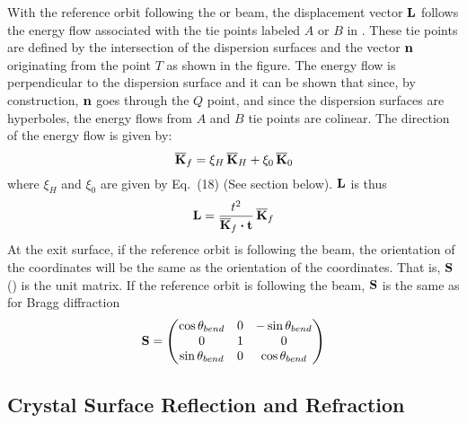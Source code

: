 With the reference orbit following the  or  beam, the
displacement vector ${\bf L}$ follows the energy flow associated with the tie points labeled $A$ or $B$
in . These tie points are defined by the intersection of the dispersion
surfaces and the vector ${\bf n}$ originating from the point $T$ as shown in the figure.  The energy
flow is perpendicular to the dispersion surface and it can be shown that since, by construction,
${\bf n}$ goes through the $Q$ point, and since the dispersion surfaces are hyperboles, the energy
flows from $A$ and $B$ tie points are colinear. The direction of the energy flow is given by:
\begin{equation}
  \overline{{\bf K}}_f = \xi_H \, \overline{{\bf K}}_H + \xi_0 \, \overline{{\bf K}}_0
\end{equation}
where $\xi_H$ and $\xi_0$ are given by \cite{b:batterman} Eq.~(18) (See section  below).
${\bf L}$ is thus
\begin{equation}
  {\bf L} = \frac{t^2}{\overline{{\bf K}}_f \mathbin{\boldsymbol{\cdot}} {\bf t}} \, \overline{{\bf K}}_f
\end{equation}
At the exit surface, if the reference orbit is following the  beam, the
orientation of the  coordinates will be the same as the orientation of the
 coordinates. That is, ${\bf S}$ () is the unit matrix.  If the reference
orbit is following the  beam, ${\bf S}$ is the same as for Bragg diffraction
\begin{equation}
  {\bf S} = 
  \begin{pmatrix}
    \cos\theta_{bend} & 0 & -\sin\theta_{bend} \\
    0                 & 1 & 0           \\
    \sin\theta_{bend} & 0 & \cos\theta_{bend}
  \end{pmatrix}
\end{equation}

\subsection{Crystal Surface Reflection and Refraction}



